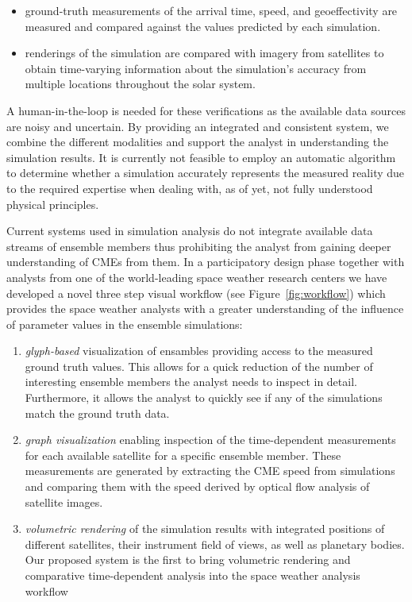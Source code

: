 \documentclass[journal]{vgtc}                %
\begin{document}
\begin{itemize}

\item{ground-truth measurements of the arrival time, speed, and geoeffectivity are measured and compared against the values predicted by each simulation.} 

\item{renderings of the simulation are compared with imagery from satellites to obtain time-varying information about the simulation's accuracy from multiple locations throughout the solar system.} 

\end{itemize}

A human-in-the-loop is needed for these verifications as the available data sources are noisy and uncertain. By providing an integrated and consistent system, we combine the different modalities and support the analyst in understanding the simulation results. It is currently not feasible to employ an automatic algorithm to determine whether a simulation accurately represents the measured reality due to the required expertise when dealing with, as of yet, not fully understood physical principles. 

Current systems used in simulation analysis do not integrate available data streams of ensemble members thus prohibiting the analyst from gaining deeper understanding of CMEs from them. In a participatory design phase together with analysts from one of the world-leading space weather research centers we have developed a novel three step visual workflow (see Figure~\ref{fig:workflow}) which provides the space weather analysts with a greater understanding of the influence of parameter values in the ensemble simulations: 

\begin{enumerate}

\item{\emph{glyph-based} visualization of ensambles providing access to the measured ground truth values. This allows for a quick reduction of the number of interesting ensemble members the analyst needs to inspect in detail. Furthermore, it allows the analyst to quickly see if any of the simulations match the ground truth data.}

\item{\emph{graph visualization} enabling inspection of the time-dependent measurements for each available satellite for a specific ensemble member. These measurements are generated by extracting the CME speed from simulations and comparing them with the speed derived by optical flow analysis of satellite images.}

\item{\emph{volumetric rendering} of the simulation results with integrated positions of different satellites, their instrument field of views, as well as planetary bodies. Our proposed system is the first to bring volumetric rendering and comparative time-dependent analysis into the space weather analysis workflow}

\end{enumerate} 
\end{document}
